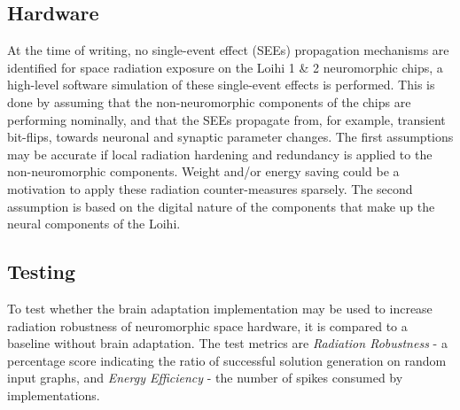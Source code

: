 \subsection*{Hardware}\label{subsec:hardware}
At the time of writing, no single-event effect (SEEs) propagation mechanisms are identified for space radiation exposure on the Loihi 1 \& 2  neuromorphic chips, a high-level software simulation of these single-event effects is performed. This is done by assuming that the non-neuromorphic components of the chips are performing nominally, and that the SEEs propagate from, for example, transient bit-flips, towards neuronal and synaptic parameter changes. The first assumptions may be accurate if local radiation hardening and redundancy is applied to the non-neuromorphic components. Weight and/or energy saving could be a motivation to apply these radiation counter-measures sparsely. The second assumption is based on the digital nature of the components that make up the neural components of the Loihi. %




\subsection*{Testing}\label{subsec:testing}
To test whether the brain adaptation implementation may be used to increase radiation robustness of neuromorphic space hardware, it is compared to a baseline without brain adaptation. The test metrics are \textit{Radiation Robustness} - a percentage score indicating the ratio of successful solution generation on random input graphs, and \textit{Energy Efficiency} - the number of spikes consumed by implementations.

